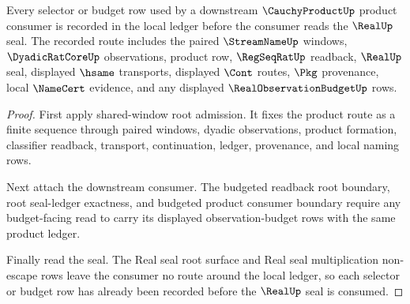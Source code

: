 \begin{theorem}
\label{thm:cauchyproduct-root-selector-ledger-exactness}
Every selector or budget row used by a downstream $\CauchyProductUp$ product consumer is recorded in the local ledger before the consumer reads the $\RealUp$ seal. The recorded route includes the paired $\StreamNameUp$ windows, $\DyadicRatCoreUp$ observations, product row, $\RegSeqRatUp$ readback, $\RealUp$ seal, displayed $\hsame$ transports, displayed $\Cont$ routes, $\Pkg$ provenance, local $\NameCert$ evidence, and any displayed $\RealObservationBudgetUp$ rows.
\end{theorem}
\begin{proof}
First apply shared-window root admission. It fixes the product route as a finite sequence through paired windows, dyadic observations, product formation, classifier readback, transport, continuation, ledger, provenance, and local naming rows.

Next attach the downstream consumer. The budgeted readback root boundary, root seal-ledger exactness, and budgeted product consumer boundary require any budget-facing read to carry its displayed observation-budget rows with the same product ledger.

Finally read the seal. The Real seal root surface and Real seal multiplication non-escape rows leave the consumer no route around the local ledger, so each selector or budget row has already been recorded before the $\RealUp$ seal is consumed.
\end{proof}

